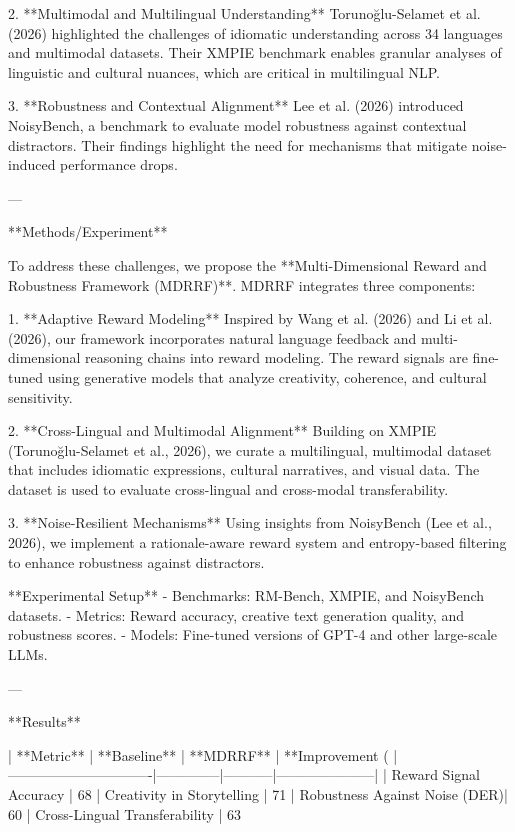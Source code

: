 2. **Multimodal and Multilingual Understanding**  
   Torunoğlu-Selamet et al. (2026) highlighted the challenges of idiomatic understanding across 34 languages and multimodal datasets. Their XMPIE benchmark enables granular analyses of linguistic and cultural nuances, which are critical in multilingual NLP.

3. **Robustness and Contextual Alignment**  
   Lee et al. (2026) introduced NoisyBench, a benchmark to evaluate model robustness against contextual distractors. Their findings highlight the need for mechanisms that mitigate noise-induced performance drops.

---

**Methods/Experiment**

To address these challenges, we propose the **Multi-Dimensional Reward and Robustness Framework (MDRRF)**. MDRRF integrates three components:

1. **Adaptive Reward Modeling**  
   Inspired by Wang et al. (2026) and Li et al. (2026), our framework incorporates natural language feedback and multi-dimensional reasoning chains into reward modeling. The reward signals are fine-tuned using generative models that analyze creativity, coherence, and cultural sensitivity.

2. **Cross-Lingual and Multimodal Alignment**  
   Building on XMPIE (Torunoğlu-Selamet et al., 2026), we curate a multilingual, multimodal dataset that includes idiomatic expressions, cultural narratives, and visual data. The dataset is used to evaluate cross-lingual and cross-modal transferability.

3. **Noise-Resilient Mechanisms**  
   Using insights from NoisyBench (Lee et al., 2026), we implement a rationale-aware reward system and entropy-based filtering to enhance robustness against distractors.

**Experimental Setup**  
- Benchmarks: RM-Bench, XMPIE, and NoisyBench datasets.
- Metrics: Reward accuracy, creative text generation quality, and robustness scores.
- Models: Fine-tuned versions of GPT-4 and other large-scale LLMs.

---

**Results**

| **Metric**                   | **Baseline** | **MDRRF** | **Improvement (%
|-------------------------------|--------------|-----------|---------------------|
| Reward Signal Accuracy        | 68%
| Creativity in Storytelling    | 71%
| Robustness Against Noise (DER)| 60%
| Cross-Lingual Transferability | 63%

